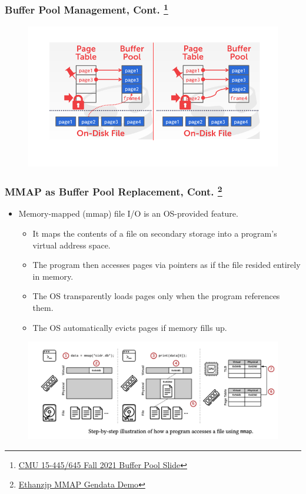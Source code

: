 \documentclass[slidestop,mathsrif]{beamer}
\begin{document}
\begin{frame}
	\frametitle{Buffer Pool Management, Cont. \footnote[frame]{\href{https://15445.courses.cs.cmu.edu/fall2021/slides/05-bufferpool.pdf}{CMU 15-445/645 Fall 2021 Buffer Pool Slide}}}
	\begin{center}
		
	\end{center}
	\begin{figure}[h]
		\centering
		\includegraphics[width=0.95\linewidth]{images/buffer1.png}
	\end{figure}
\end{frame}


\begin{frame}
\frametitle{MMAP as Buffer Pool Replacement, Cont. \footnote[frame]{\href{https://github.com/Ethanzjp/Snippets/tree/master/gendata\_mmap}{Ethanzjp MMAP Gendata Demo}}}
    \begin{itemize}
        \item Memory-mapped (mmap) file I/O is an OS-provided feature.
        \begin{itemize}
        	\item<1->[\checkmark] It maps {\color{red}the contents of a file }on secondary storage into a {\color{red}program’s virtual address space}.
        	\item<2->[\checkmark] The program then accesses pages via {\color{red}pointers} as if the file resided entirely in memory. 
        	\item<3->[\checkmark] The OS {\color{red}transparently loads pages} only when the program references them.
        	\item<4->[\checkmark] The OS {\color{red}automatically evicts pages} if memory fills up.
        \end{itemize}
    \end{itemize}
	\pause
 \begin{figure}[h]
	\includegraphics[width=0.75\linewidth]{images/sts.png}
\end{figure}
\end{frame}
\end{document}
